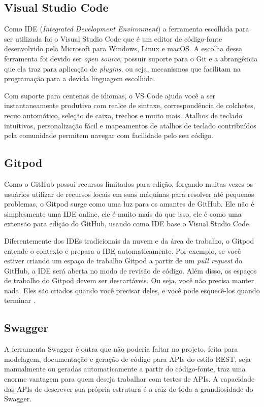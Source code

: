 \subsection{Visual Studio Code}
Como IDE (\textit{Integrated Development Environment}) a ferramenta escolhida para ser utilizada foi o Visual Studio Code que é um editor de código-fonte desenvolvido pela Microsoft para Windows, Linux e macOS. A escolha dessa ferramenta foi devido ser \textit{open source}, possuir suporte para o Git e a abrangência que ela traz para aplicação de \textit{plugins}, ou seja, mecanismos que facilitam na programação para a devida linguagem escolhida.

Com suporte para centenas de idiomas, o VS Code ajuda você a ser instantaneamente produtivo com realce de sintaxe, correspondência de colchetes, recuo automático, seleção de caixa, trechos e muito mais. Atalhos de teclado intuitivos, personalização fácil e mapeamentos de atalhos de teclado contribuídos pela comunidade permitem navegar com facilidade pelo seu código. \cite{mjbvz2020VSCode}


\subsection{Gitpod}
Como o GitHub possui recursos limitados para edição, forçando muitas vezes os usuários utilizar de recursos locais em suas máquinas para resolver até pequenos problemas, o Gitpod surge como uma luz para os amantes de GitHub. Ele não é simplesmente uma IDE online, ele é muito mais do que isso, ele é como uma extensão para edição do GitHub, usando como IDE base o Visual Studio Code. 

Diferentemente dos IDEs tradicionais da nuvem e da área de trabalho, o Gitpod entende o contexto e prepara o IDE automaticamente. Por exemplo, se você estiver criando um espaço de trabalho Gitpod a partir de um \textit{pull request} do GitHub, a IDE será aberta no modo de revisão de código. Além disso, os espaços de trabalho do Gitpod devem ser descartáveis. Ou seja, você não precisa manter nada. Eles são criados quando você precisar deles, e você pode esquecê-los quando terminar \cite{jankeromnes2020Gitpod}. 


\subsection{Swagger}
A ferramenta Swagger é outra que não poderia faltar no projeto, feita para modelagem, documentação e geração de código para APIs do estilo REST, seja manualmente ou geradas automaticamente a partir do código-fonte, traz uma enorme vantagem para quem deseja trabalhar com testes de APIs. A capacidade das APIs de descrever sua própria estrutura é a raiz de toda a grandiosidade do Swagger.

